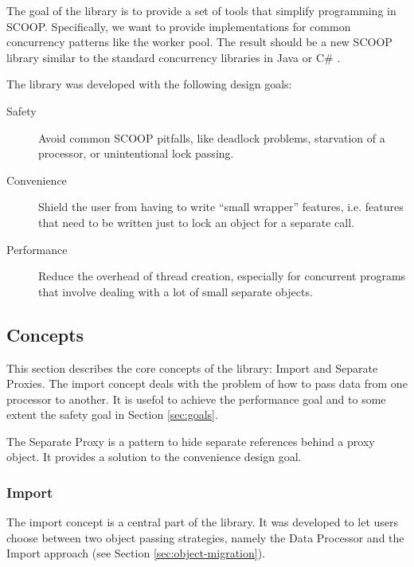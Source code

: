 \documentclass[a4paper,10pt]{article}
\begin{document}
The goal of the library is to provide a set of tools that simplify programming in SCOOP.
Specifically, we want to provide implementations for common concurrency patterns like the worker pool.
The result should be a new SCOOP library similar to the standard concurrency libraries in Java \cite{web:java-concurrency} or C\# \cite{web:ms-tpl}.

The library was developed with the following design goals:

\begin{description}
 \item [Safety]\label{item:safety} Avoid common SCOOP pitfalls, like deadlock problems, starvation of a processor, or unintentional lock passing.
 \item [Convenience]\label{item:convenience} Shield the user from having to write ``small wrapper'' features, i.e. features that need to be written just to lock an object for a separate call.
 \item [Performance]\label{item:performance} Reduce the overhead of thread creation, especially for concurrent programs that involve dealing with a lot of small separate objects.
\end{description}

\subsection{Concepts}

This section describes the core concepts of the library: Import and Separate Proxies.
The import concept deals with the problem of how to pass data from one processor to another.
It is usefol to achieve the performance goal and to some extent the safety goal in Section \ref{sec:goals}.

The Separate Proxy  is a pattern to hide separate references behind a proxy object.
It provides a solution to the convenience design goal.

\subsubsection{Import}
\label{sec:concepts:import}

The import concept is a central part of the library.
It was developed to let users choose between two object passing strategies, namely the Data Processor and the Import approach (see Section \ref{sec:object-migration}).
\end{document}
